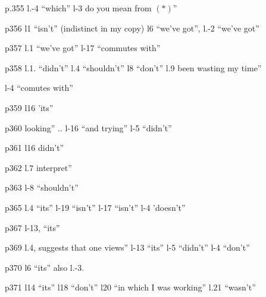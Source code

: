 p.355 l.-4 ``which'' l-3 do you mean from $(*)$''

p356 l1 ``isn't'' (indistinct in my copy) l6 ``we've got'',  l.-2 ``we've got''

p357 l.1 ``we've got''  l-17 ``commutes with''

p358 l.1. ``didn't'' l.4 ``shouldn't'' l8 ``don't'' l.9 been wasting my time''

l-4 ``comutes with''

p359 l16 'its''

p360   looking'' .. l-16 ``and trying'' l-5 ``didn't''

p361 l16 didn't''

p362 l.7 interpret''

p363 l-8 ``shouldn't''

p365 l.4 ``its'' l-19 ``isn't'' l-17 ``isn't'' l-4 'doesn't''

p367 l-13, ``its''

p369 l.4, suggests that one views'' l-13 ``its'' l-5 ``didn't'' l-4 ``don't''

p370 l6 ``its'' also l.-3.

p371 l14 ``its'' l18 ``don't'' l20 ``in which I was working'' l.21 ``wasn't''


